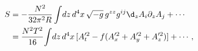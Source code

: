 \begin{equation}
\begin{split}
S &= - \frac{N^2}{32 \pi^2 R} 
\int\! dz\,d^4x\, \sqrt{-g}\, g^{zz} g^{ij}  \d_z A_i \partial_z A_j
 +\cdots
  \\
 &=  \frac{N^2 T^2}{16}\!
\int\! dz\, d^4x\, [ A_t'^2 - f(A_x'^2 +  A_y'^2 + A_z'^2)]+\cdots\,,
\end{split}
\end{equation}

